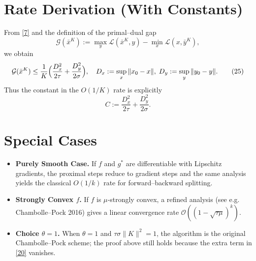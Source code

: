 \documentclass{article}
\newcommand{\norm}[1]{\|#1\|}
\begin{document}
\section*{Rate Derivation (With Constants)}
From \eqref{7} and the definition of the primal–dual gap
\[
\mathcal{G}(\bar x^{K}) := \max_{y}\mathcal{L}(\bar x^{K},y)-\min_{x}\mathcal{L}(x,\bar y^{K}),
\]
we obtain
\[
\mathcal{G}(\bar x^{K})\le
\frac{1}{K}\Bigl(\frac{D_{x}^{2}}{2\tau}+\frac{D_{y}^{2}}{2\sigma}\Bigr),
\quad
D_{x}:=\sup_{x}\norm{x_{0}-x},\;
D_{y}:=\sup_{y}\norm{y_{0}-y}.
\tag{25}
\]
Thus the constant in the $O(1/K)$ rate is explicitly
\[
C:=\frac{D_{x}^{2}}{2\tau}+\frac{D_{y}^{2}}{2\sigma}.
\]

\section*{Special Cases}
\begin{itemize}[noitemsep]
\item \textbf{Purely Smooth Case.} If $f$ and $g^{*}$ are differentiable with Lipschitz gradients, the proximal steps reduce to gradient steps and the same analysis yields the classical $O(1/k)$ rate for forward–backward splitting.
\item \textbf{Strongly Convex $f$.} If $f$ is $\mu$‑strongly convex, a refined analysis (see e.g. Chambolle–Pock 2016) gives a linear convergence rate $\mathcal{O}((1-\sqrt{\tau\mu})^{k})$.
\item \textbf{Choice $\theta=1$.} When $\theta=1$ and $\tau\sigma\|K\|^{2}=1$, the algorithm is the original Chambolle–Pock scheme; the proof above still holds because the extra term in \eqref{20} vanishes.
\end{itemize}
\end{document}
